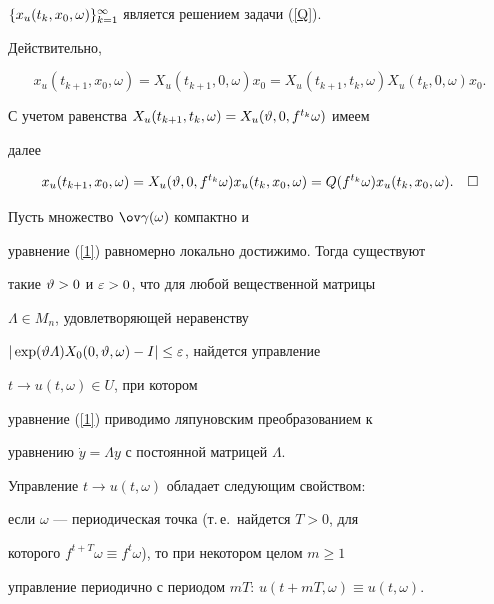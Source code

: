 $\{x_u(t_k,x_0,\omega)\}_{k=1}^{\infty}$ является решением задачи (\ref{Q}).


Действительно,


$$


x_u(t_{k+1},x_0,\omega)=X_u(t_{k+1},0,\omega)x_0=


X_u(t_{k+1},t_k,\omega)X_u(t_k,0,\omega)x_0.


$$


С учетом равенства $X_u(t_{k+1},t_k,\omega)=X_u(\vartheta,0,f^{t_k}\omega)$ имеем


далее


$$


x_u(t_{k+1},x_0,\omega)=X_u(\vt,0,f^{t_k}\omega)x_u(t_k,x_0,\omega)=


Q(f^{t_k}\omega)x_u(t_k,x_0,\omega).\quad\square


$$





\begin{cor}


\label{St}


Пусть множество $\ov\gamma(\omega)$ компактно и


уравнение (\ref{1}) равномерно локально достижимо. Тогда существуют


такие $\vartheta>0$ и $\varepsilon>0$, что для любой вещественной матрицы


$\varLambda\in M_n$, удовлетворяющей неравенству


$|\exp(\vartheta\varLambda)X_0(0,\vartheta,\omega)-I|\le\varepsilon$, найдется управление


$t\to u(t,\omega)\in U$, при котором


уравнение (\ref{1}) приводимо ляпуновским преобразованием к


уравнению $\Dot y=\varLambda y$ с постоянной матрицей $\varLambda$.





Управление $t\to u(t,\omega)$ обладает следующим свойством:


если $\omega$ --- периодическая точка (т.\,е.~найдется $T>0$, для


которого $f^{t+T}\omega\equiv f^t\omega$), то при некотором целом $m\ge 1$


управление периодично с периодом $mT$: $u(t+mT,\omega)\equiv u(t,\omega)$.


\end{cor}






